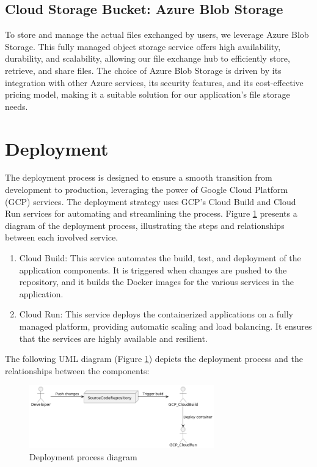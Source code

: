 \documentclass[a4paper,fleqn]{cas-dc}
\begin{document}
\subsection{Cloud Storage Bucket: Azure Blob Storage}

To store and manage the actual files exchanged by users, we leverage Azure Blob Storage. This fully managed object storage service offers high availability, durability, and scalability, allowing our file exchange hub to efficiently store, retrieve, and share files. The choice of Azure Blob Storage is driven by its integration with other Azure services, its security features, and its cost-effective pricing model, making it a suitable solution for our application's file storage needs.

\section{Deployment} \label{sec:deployment}

The deployment process is designed to ensure a smooth transition from development to production, leveraging the power of Google Cloud Platform (GCP) services. The deployment strategy uses GCP's Cloud Build and Cloud Run services for automating and streamlining the process. Figure \ref{fig:deployment} presents a diagram of the deployment process, illustrating the steps and relationships between each involved service.

\begin{enumerate}
    \item Cloud Build: This service automates the build, test, and deployment of the application components. It is triggered when changes are pushed to the repository, and it builds the Docker images for the various services in the application.
    \item Cloud Run: This service deploys the containerized applications on a fully managed platform, providing automatic scaling and load balancing. It ensures that the services are highly available and resilient.
\end{enumerate}

The following UML diagram (Figure \ref{fig:deployment}) depicts the deployment process and the relationships between the components:

\begin{figure}[h]
    \centering
    \includegraphics[width=8cm]{deployment.png}
    \caption{Deployment process diagram}
    \label{fig:deployment}
\end{figure}
\end{document}
